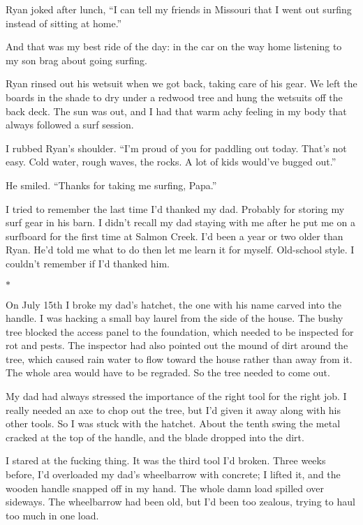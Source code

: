 \documentclass[12pt]{book}
\begin{document}
Ryan joked after lunch, ``I can tell my friends in Missouri that I went out surfing instead of sitting at home.''

And that was my best ride of the day: in the car on the way home listening to my son brag about going surfing.

Ryan rinsed out his wetsuit when we got back, taking care of his gear. We left the boards in the shade to dry under a redwood tree and hung the wetsuits off the back deck. The sun was out, and I had that warm achy feeling in my body that always followed a surf session.

I rubbed Ryan's shoulder. ``I'm proud of you for paddling out today. That's not easy. Cold water, rough waves, the rocks. A lot of kids would've bugged out.''

He smiled. ``Thanks for taking me surfing, Papa.''

I tried to remember the last time I'd thanked my dad. Probably for storing my surf gear in his barn. I didn't recall my dad staying with me after he put me on a surfboard for the first time at Salmon Creek. I'd been a year or two older than Ryan. He'd told me what to do then let me learn it for myself. Old-school style. I couldn't remember if I'd thanked him.

\begin{center}$*$\end{center}

On July 15th I broke my dad's hatchet, the one with his name carved into the handle. I was hacking a small bay laurel from the side of the house. The bushy tree blocked the access panel to the foundation, which needed to be inspected for rot and pests. The inspector had also pointed out the mound of dirt around the tree, which caused rain water to flow toward the house rather than away from it. The whole area would have to be regraded. So the tree needed to come out.

My dad had always stressed the importance of the right tool for the right job. I really needed an axe to chop out the tree, but I'd given it away along with his other tools. So I was stuck with the hatchet. About the tenth swing the metal cracked at the top of the handle, and the blade dropped into the dirt.

I stared at the fucking thing. It was the third tool I'd broken. Three weeks before, I'd overloaded my dad's wheelbarrow with concrete; I lifted it, and the wooden handle snapped off in my hand. The whole damn load spilled over sideways. The wheelbarrow had been old, but I'd been too zealous, trying to haul too much in one load.
\end{document}
